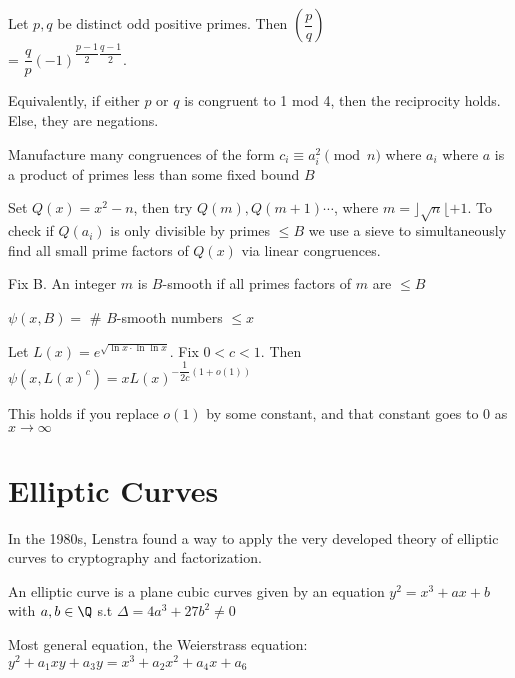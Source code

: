 \documentclass[10pt]{article}
\begin{document}
\begin{defn}
    Let $p, q$ be distinct odd positive primes. Then
    $\left(\dfrac{p}{q}\right)$\\ 
    = $\dfrac{q}{p}(-1)^{\dfrac{p-1}{2}\dfrac{q-1}{2}}$.
\end{defn}
Equivalently, if either $p$ or $q$ is congruent to 1 mod 4, then the reciprocity holds. Else, they are negations.
\begin{defn} 
    
\end{defn}
Manufacture many congruences of the form $c_i \equiv a_i^2 \pmod{n}$ where $a_i$ where $a$ is a product of primes less than some fixed bound $B$

Set $Q(x) = x^2 - n$, then try $Q(m), Q(m + 1) \cdots$, where $m = \rfloor\sqrt n \lfloor + 1$. To check if $Q(a_i)$ is only divisible by primes $\leq B$ we use a sieve to simultaneously find all small prime factors of $Q(x)$ via linear congruences. 

\begin{defn}
    Fix B. An integer $m$ is $B$-smooth if all primes factors of $m$ are $\leq B$
\end{defn}

\begin{defn}
    $\psi(x, B) = $ \# $B$-smooth numbers $\leq x$
\end{defn}

\begin{thm}
    Let $L(x) = e^{\sqrt{\ln x \cdot \ln\ln x}}$. Fix $0 < c < 1$. Then $\psi(x, L(x)^c) = xL(x)^{-\dfrac{1}{2c}(1 + o(1))}$
\end{thm}
This holds if you replace $o(1)$ by some constant, and that constant goes to 0 as $x\to\infty$

\section{Elliptic Curves}
In the 1980s, Lenstra found a way to apply the very developed theory of elliptic curves to cryptography and factorization. 

\begin{defn}
    An elliptic curve is a plane cubic curves given by an equation $y^2 = x^3 + ax + b$ with $a, b \in \Q$ s.t $\Delta = 4a^3 + 27b^2 \neq 0$
\end{defn}

\begin{rmk}
    Most general equation, the Weierstrass equation: $y^2 + a_1xy + a_3y = x^3 + a_2x^2 + a_4x + a_6$
\end{rmk}
\end{document}
